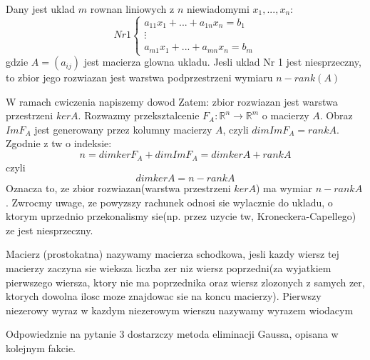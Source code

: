 \documentclass{article}
\begin{document}
\begin{tcolorbox}[colback=white!90!green,colframe=black!35!green,title=Fakt 2.50 Zbior rozwiazan ukladu rownan liniowych]
Dany jest uklad $m$ rownan liniowych z $n$ niewiadomymi $x_{1},...,x_{n}$:
$$Nr 1 \begin{cases}
a_{11}x_{1} + ... + a_{1n}x_{n} = b_{1} \\
\vdots \\
a_{m1}x_{1} + ... + a_{mn}x_{n} = b_{m}
\end{cases} $$
gdzie $A = (a_{ij})$ jest macierza glowna ukladu. Jesli uklad Nr 1 jest niesprzeczny, to zbior jego rozwiazan jest warstwa podprzestrzeni wymiaru $n-rank(A)$

\end{tcolorbox}
\vspace{19mm}
W ramach cwiczenia napiszemy dowod
Zatem: zbior rozwiazan jest warstwa przestrzeni $kerA$. Rozwazmy przeksztalcenie $F_{A} : \mathbb{R}^n \rightarrow \mathbb{R}^{m}$ o macierzy $A$. Obraz $ImF_{A}$ jest generowany przez kolumny macierzy $A$, czyli $dimImF_{A} = rankA$. Zgodnie z tw o indeksie:
$$ n = dimkerF_{A} + dimImF_{A} = dimkerA + rankA$$
czyli
$$ dimkerA = n - rankA$$
Oznacza to, ze zbior rozwiazan(warstwa przestrzeni $kerA$) ma wymiar $n - rankA$. Zwrocmy uwage, ze powyzszy rachunek odnosi sie wylacznie do ukladu, o ktorym uprzednio przekonalismy sie(np. przez uzycie tw, Kroneckera-Capellego) ze jest niesprzeczny.

\begin{tcolorbox}[colback=white!90!red,colframe=black!35!red,title=Definicja 2.51 Macierz schodkowa]

Macierz (prostokatna) nazywamy macierza schodkowa, jesli kazdy wiersz tej macierzy zaczyna sie wieksza liczba zer niz wiersz poprzedni(za wyjatkiem pierwszego wiersza, ktory nie ma poprzednika oraz wiersz zlozonych z samych zer, ktorych dowolna ilosc moze znajdowac sie na koncu macierzy). Pierwszy niezerowy wyraz w kazdym niezerowym wierszu nazywamy wyrazem wiodacym

\end{tcolorbox}

Odpowiedznie na pytanie 3 dostarzczy metoda eliminacji Gaussa, opisana w kolejnym fakcie.
\end{document}
